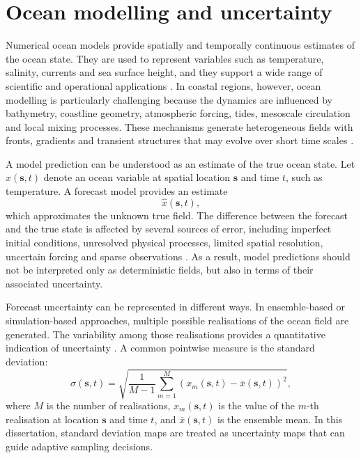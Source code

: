 \section{Ocean modelling and uncertainty} \label{sec:ocean_modelling_uncertainty}

Numerical ocean models provide spatially and temporally continuous estimates of the ocean state. They are used to represent variables such as temperature, salinity, currents and sea surface height, and they support a wide range of scientific and operational applications \cite{wunsch2007stateestimation,lermusiaux2007adaptive}. In coastal regions, however, ocean modelling is particularly challenging because the dynamics are influenced by bathymetry, coastline geometry, atmospheric forcing, tides, mesoscale circulation and local mixing processes. These mechanisms generate heterogeneous fields with fronts, gradients and transient structures that may evolve over short time scales \cite{mendes2025oceanmodeldriven}.

A model prediction can be understood as an estimate of the true ocean state. Let $x(\mathbf{s},t)$ denote an ocean variable at spatial location $\mathbf{s}$ and time $t$, such as temperature. A forecast model provides an estimate
\begin{equation}
    \hat{x}(\mathbf{s},t),
\end{equation}
which approximates the unknown true field. The difference between the forecast and the true state is affected by several sources of error, including imperfect initial conditions, unresolved physical processes, limited spatial resolution, uncertain forcing and sparse observations \cite{dowd2014dataassimilation}. As a result, model predictions should not be interpreted only as deterministic fields, but also in terms of their associated uncertainty.

Forecast uncertainty can be represented in different ways. In ensemble-based or simulation-based approaches, multiple possible realisations of the ocean field are generated. The variability among those realisations provides a quantitative indication of uncertainty \cite{duarte2025geostatistical}. A common pointwise measure is the standard deviation:
\begin{equation}
    \sigma(\mathbf{s},t) =
    \sqrt{
    \frac{1}{M-1}
    \sum_{m=1}^{M}
    \left(x_m(\mathbf{s},t)-\bar{x}(\mathbf{s},t)\right)^2
    },
\end{equation}
where $M$ is the number of realisations, $x_m(\mathbf{s},t)$ is the value of the $m$-th realisation at location $\mathbf{s}$ and time $t$, and $\bar{x}(\mathbf{s},t)$ is the ensemble mean. In this dissertation, standard deviation maps are treated as uncertainty maps that can guide adaptive sampling decisions.

